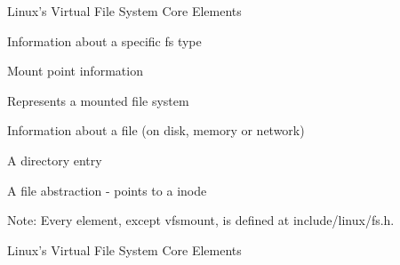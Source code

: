 \documentclass{beamer}
\begin{document}
\begin{frame}{Linux's Virtual File System Core Elements}

	\begin{description}[<+->]\itemsep4pt
			
		\item[file\_system\_type]{Information about a specific fs type}
		\item[vfsmount]{Mount point information}		
		\item[super\_block]{Represents a mounted file system}
		\item[inode]{Information about a file (on disk, memory or network)}
		\item[dentry]{A directory entry}
		\item[file]{A file abstraction - points to a inode}

		\vspace{15pt}

		\item{Note: Every element, except vfsmount, is defined at include/linux/fs.h.}

	\end{description}

\end{frame}

\begin{frame}{Linux's Virtual File System Core Elements}
	

\end{frame}
\end{document}
